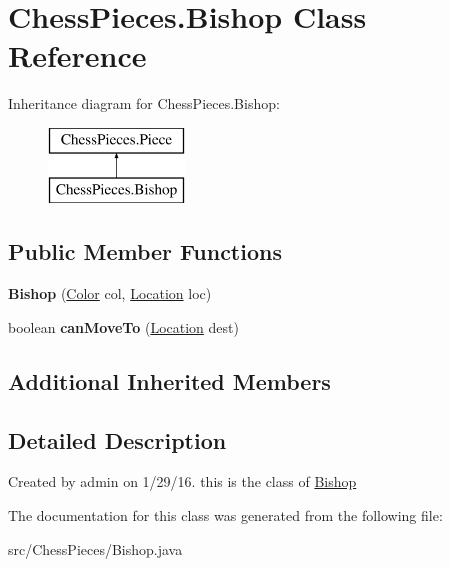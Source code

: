 \hypertarget{class_chess_pieces_1_1_bishop}{}\section{Chess\+Pieces.\+Bishop Class Reference}
\label{class_chess_pieces_1_1_bishop}
Inheritance diagram for Chess\+Pieces.\+Bishop\+:\begin{figure}[H]
\begin{center}
\leavevmode
\includegraphics[height=2.000000cm]{class_chess_pieces_1_1_bishop}
\end{center}
\end{figure}
\subsection*{Public Member Functions}
\begin{DoxyCompactItemize}
\item 
{\bfseries Bishop} (\hyperlink{enum_chess_pieces_1_1_color}{Color} col, \hyperlink{class_chess_pieces_1_1_location}{Location} loc)\hypertarget{class_chess_pieces_1_1_bishop_a29778e28497c7cbba679f1f12864f54b}{}\label{class_chess_pieces_1_1_bishop_a29778e28497c7cbba679f1f12864f54b}

\item 
boolean {\bfseries can\+Move\+To} (\hyperlink{class_chess_pieces_1_1_location}{Location} dest)\hypertarget{class_chess_pieces_1_1_bishop_a89fbf2408312d3976c8f203fefd49ecd}{}\label{class_chess_pieces_1_1_bishop_a89fbf2408312d3976c8f203fefd49ecd}

\end{DoxyCompactItemize}
\subsection*{Additional Inherited Members}


\subsection{Detailed Description}
Created by admin on 1/29/16. this is the class of \hyperlink{class_chess_pieces_1_1_bishop}{Bishop} 

The documentation for this class was generated from the following file\+:\begin{DoxyCompactItemize}
\item 
src/\+Chess\+Pieces/Bishop.\+java\end{DoxyCompactItemize}

